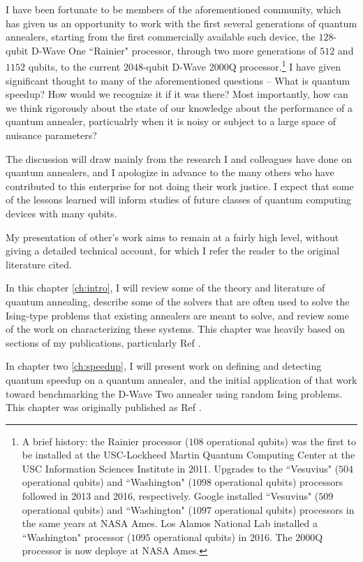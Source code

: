 I have been fortunate to be members of the aforementioned community, which has given us an opportunity to work with the first several generations of quantum annealers, starting from the first commercially available such device, the $128$-qubit D-Wave One ``Rainier" processor, through two more generations of $512$ and $1152$ qubits, to the current $2048$-qubit D-Wave 2000Q processor.\footnote{A brief history: the Rainier processor ($108$ operational qubits) was the first to be installed at the USC-Lockheed Martin Quantum Computing Center at the USC Information Sciences Institute in 2011. Upgrades to the ``Vesuvius" ($504$ operational qubits) and ``Washington" ($1098$ operational qubits) processors followed in 2013 and 2016, respectively. Google installed ``Vesuvius" ($509$ operational qubits) and ``Washington" ($1097$ operational qubits) processors in the same years at NASA Ames. Los Alamos National Lab installed a ``Washington" processor ($1095$ operational qubits) in 2016. The 2000Q processor is now deploye at NASA Ames.} I have given significant thought to many of the aforementioned questions -- What is quantum speedup? How would we recognize it if it was there? Most importantly, how can we think rigorously about the state of our knowledge about the performance of a quantum annealer, particualrly when it is noisy or subject to a large space of nuisance parameters?

The discussion will draw mainly from the research I and colleagues have done on quantum annealers, and I apologize in advance to the many others who have contributed to this enterprise for not doing their work justice. I expect that some of the lessons learned will inform studies of future classes of quantum computing devices with many qubits.

My presentation of other's work aims to remain at a fairly high level, without giving a detailed technical account, for which I refer the reader to the original literature cited.

In this chapter \ref{ch:intro}, I will review some of the theory and literature of quantum annealing, describe some of the solvers that are often used to solve the Ising-type problems that existing annealers are meant to solve, and review some of the work on characterizing these systems. This chapter was heavily based on sections of my publications, particularly Ref \cite{job2018test}.

In chapter two \ref{ch:speedup}, I will present work on defining and detecting quantum speedup on a quantum annealer, and the initial application of that work toward benchmarking the D-Wave Two annealer using random Ising problems. This chapter was originally published as Ref \cite{speedup}.


